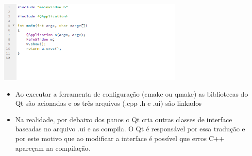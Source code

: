 \documentclass[10pt]{beamer}
\theoremstyle{remark}
\theoremstyle{definition}
\begin{document}
\begin{frame}[allowframebreaks]
	\begin{center}
		\includegraphics[width=0.7\textwidth]{images/30.png}
	\end{center}
		
	\framebreak
	
	\begin{itemize}
		\item Ao executar a ferramenta de configuração (cmake ou qmake) as bibliotecas do Qt são acionadas e os três arquivos (.cpp .h e .ui) são linkados
		
		\item Na realidade, por debaixo dos panos o Qt cria outras classes de interface baseadas no arquivo .ui e as compila. O Qt é responsável por essa tradução e por este motivo que ao modificar a interface é possível que erros C++ apareçam na compilação.
	\end{itemize}
\end{frame}
\end{document}
